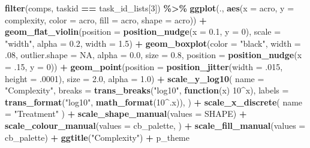 \documentclass[
]{book}
\newenvironment{Shaded}{\begin{snugshade}}{\end{snugshade}}
\newcommand{\AttributeTok}[1]{\textcolor[rgb]{0.13,0.29,0.53}{#1}}
\newcommand{\ConstantTok}[1]{\textcolor[rgb]{0.56,0.35,0.01}{#1}}
\newcommand{\ControlFlowTok}[1]{\textcolor[rgb]{0.13,0.29,0.53}{\textbf{#1}}}
\newcommand{\DecValTok}[1]{\textcolor[rgb]{0.00,0.00,0.81}{#1}}
\newcommand{\FloatTok}[1]{\textcolor[rgb]{0.00,0.00,0.81}{#1}}
\newcommand{\FunctionTok}[1]{\textcolor[rgb]{0.13,0.29,0.53}{\textbf{#1}}}
\newcommand{\NormalTok}[1]{#1}
\newcommand{\SpecialCharTok}[1]{\textcolor[rgb]{0.81,0.36,0.00}{\textbf{#1}}}
\newcommand{\StringTok}[1]{\textcolor[rgb]{0.31,0.60,0.02}{#1}}
\begin{document}
\begin{Shaded}
\begin{Highlighting}[]
\FunctionTok{filter}\NormalTok{(comps, taskid }\SpecialCharTok{==}\NormalTok{ task\_id\_lists[}\DecValTok{3}\NormalTok{]) }\SpecialCharTok{\%\textgreater{}\%}
  \FunctionTok{ggplot}\NormalTok{(., }\FunctionTok{aes}\NormalTok{(}\AttributeTok{x =}\NormalTok{ acro, }\AttributeTok{y =}\NormalTok{ complexity, }\AttributeTok{color =}\NormalTok{ acro,}
                \AttributeTok{fill =}\NormalTok{ acro, }\AttributeTok{shape =}\NormalTok{ acro)) }\SpecialCharTok{+}
  \FunctionTok{geom\_flat\_violin}\NormalTok{(}\AttributeTok{position =} \FunctionTok{position\_nudge}\NormalTok{(}\AttributeTok{x =} \FloatTok{0.1}\NormalTok{, }\AttributeTok{y =} \DecValTok{0}\NormalTok{),}
                   \AttributeTok{scale =} \StringTok{"width"}\NormalTok{, }\AttributeTok{alpha =} \FloatTok{0.2}\NormalTok{, }\AttributeTok{width =} \FloatTok{1.5}\NormalTok{) }\SpecialCharTok{+}
  \FunctionTok{geom\_boxplot}\NormalTok{(}\AttributeTok{color =} \StringTok{"black"}\NormalTok{, }\AttributeTok{width =}\NormalTok{ .}\DecValTok{08}\NormalTok{, }\AttributeTok{outlier.shape =} \ConstantTok{NA}\NormalTok{, }\AttributeTok{alpha =} \FloatTok{0.0}\NormalTok{,}
               \AttributeTok{size =} \FloatTok{0.8}\NormalTok{, }\AttributeTok{position =} \FunctionTok{position\_nudge}\NormalTok{(}\AttributeTok{x =}\NormalTok{ .}\DecValTok{15}\NormalTok{, }\AttributeTok{y =} \DecValTok{0}\NormalTok{)) }\SpecialCharTok{+}
  \FunctionTok{geom\_point}\NormalTok{(}\AttributeTok{position =} \FunctionTok{position\_jitter}\NormalTok{(}\AttributeTok{width =}\NormalTok{ .}\DecValTok{015}\NormalTok{, }\AttributeTok{height =}\NormalTok{ .}\DecValTok{0001}\NormalTok{),}
             \AttributeTok{size =} \FloatTok{2.0}\NormalTok{, }\AttributeTok{alpha =} \FloatTok{1.0}\NormalTok{) }\SpecialCharTok{+}
  \FunctionTok{scale\_y\_log10}\NormalTok{(}
    \AttributeTok{name =} \StringTok{"Complexity"}\NormalTok{,}
    \AttributeTok{breaks =} \FunctionTok{trans\_breaks}\NormalTok{(}\StringTok{"log10"}\NormalTok{, }\ControlFlowTok{function}\NormalTok{(x) }\DecValTok{10}\SpecialCharTok{\^{}}\NormalTok{x),}
    \AttributeTok{labels =} \FunctionTok{trans\_format}\NormalTok{(}\StringTok{"log10"}\NormalTok{, }\FunctionTok{math\_format}\NormalTok{(}\DecValTok{10}\SpecialCharTok{\^{}}\NormalTok{.x)),}
\NormalTok{  ) }\SpecialCharTok{+}
  \FunctionTok{scale\_x\_discrete}\NormalTok{(}
    \AttributeTok{name =} \StringTok{"Treatment"}
\NormalTok{  ) }\SpecialCharTok{+}
  \FunctionTok{scale\_shape\_manual}\NormalTok{(}\AttributeTok{values =}\NormalTok{ SHAPE) }\SpecialCharTok{+}
  \FunctionTok{scale\_colour\_manual}\NormalTok{(}\AttributeTok{values =}\NormalTok{ cb\_palette, ) }\SpecialCharTok{+}
  \FunctionTok{scale\_fill\_manual}\NormalTok{(}\AttributeTok{values =}\NormalTok{ cb\_palette) }\SpecialCharTok{+}
  \FunctionTok{ggtitle}\NormalTok{(}\StringTok{"Complexity"}\NormalTok{) }\SpecialCharTok{+}
\NormalTok{  p\_theme}
\end{Highlighting}
\end{Shaded}
\end{document}
